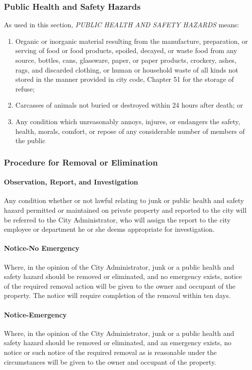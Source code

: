 \documentclass[code.tex]{subfiles}
\begin{document}
\subsubsection{Public Health and Safety Hazards}
As used in this section, \emph{PUBLIC HEALTH AND SAFETY HAZARDS} means:
\begin{enumerate}[{\indent}a)]
    \item Organic or inorganic material resulting from the manufacture, preparation, or serving of food or food products, spoiled, decayed, or waste food from any source, bottles, cans, glassware, paper, or paper products, crockery, ashes, rags, and discarded clothing, or human or household waste of all kinds not stored in the manner provided in city code, Chapter 51 for the storage of refuse; 
    \item Carcasses of animals not buried or destroyed within 24 hours after death; or 
    \item Any condition which unreasonably annoys, injures, or endangers the safety, health, morals, comfort, or repose of any considerable number of members of the public 
\end{enumerate}
\subsubsection{Procedure for Removal or Elimination}
\paragraph{Observation, Report, and Investigation}
Any condition whether or not lawful relating to junk or public health and safety hazard permitted or maintained on private property and reported to the city will be referred to the City Administrator, who will assign the report to the city employee or department he or she deems appropriate for investigation.
\paragraph{Notice-No Emergency}
Where, in the opinion of the City Administrator, junk or a public health and safety hazard should be removed or eliminated, and no emergency exists, notice of the required removal action will be given to the owner and occupant of the property.  The notice will require completion of the removal within ten days.
\paragraph{Notice-Emergency}
Where, in the opinion of the City Administrator, junk or a public health and safety hazard should be removed or eliminated, and an emergency exists, no notice or such notice of the required removal as is reasonable under the circumstances will be given to the owner and occupant of the property.
\end{document}
